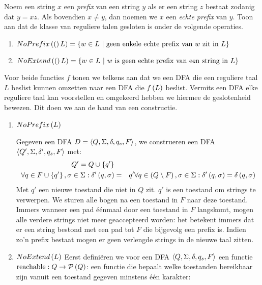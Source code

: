 \documentclass[a4paper]{article}
\begin{document}
\begin{question}
Noem een string $x$ een \emph{prefix} van een string $y$ als er een string $z$ bestaat zodanig dat $y = xz$. Als bovendien $x \neq y$, dan noemen we $x$ een \emph{echte prefix} van $y$. Toon aan dat de klasse van reguliere talen gesloten is onder de volgende operaties.
\begin{enumerate}
  \item $\fun{NoPrefix} (L) = \{ w \in L \ | \ \mbox{geen enkele echte prefix van $w$ zit in $L$} \}$
  \item $\fun{NoExtend} (L) = \{ w \in L \ | \ \mbox{$w$ is geen echte prefix van een string in $L$} \}$
\end{enumerate}
\begin{answer}
Voor beide functies $f$ tonen we telkens aan dat we een DFA die een reguliere taal $L$ beslist kunnen omzetten naar een DFA die $f\left( L \right)$ beslist. Vermits een DFA elke reguliere taal kan voorstellen en omgekeerd hebben we hiermee de geslotenheid bewezen. Dit doen we aan de hand van een constructie.
\begin{enumerate}
 \item $NoPrefix\left( L \right)$
 \begin{construction}
  Gegeven een DFA $D=\left\langle Q,\Sigma,\delta,q_s,F\right\rangle$, we construeren een DFA $\left\langle Q',\Sigma,\delta',q_s,F \right\rangle$ met:
  \begin{eqnarray}
  Q'=Q\cup\left\{ q' \right\}\\
  \forall q\in F\cup\left\{ q' \right\},\sigma\in\Sigma:\delta'\left( q,\sigma \right)&=&q'
  \forall q\in\left( Q\setminus F \right),\sigma\in\Sigma:\delta'\left( q,\sigma \right)=\delta\left( q,\sigma \right)
  \end{eqnarray}
  Met $q'$ een nieuwe toestand die niet in $Q$ zit. $q'$ is een toestand om strings te verwerpen. We sturen alle bogen na een toestand in $F$ naar deze toestand. Immers wanneer een pad \'e\'enmaal door een toestand in $F$ langskomt, mogen alle verdere strings niet meer geaccepteerd worden: het betekent immers dat er een string bestond met een pad tot $F$ die bijgevolg een prefix is. Indien zo'n prefix bestaat mogen er geen verlengde strings in de nieuwe taal zitten.
 \end{construction}
 \item $NoExtend\left( L \right)$
 Eerst defini\"eren we voor een DFA $\left\langle Q,\Sigma,\delta,q_s,F \right\rangle$ een functie $\mbox{reachable}:Q\rightarrow\mathcal{P}\left( Q \right)$: een functie die bepaalt welke toestanden bereikbaar zijn vanuit een toestand gegeven minstens \'e\'en karakter:
 \begin{equation}

\end{equation}
\end{enumerate}
\end{answer}
\end{question}
\end{document}
